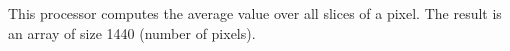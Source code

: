 This processor computes the average value over all slices of a
pixel. The result is an array of size 1440 (number of pixels).
